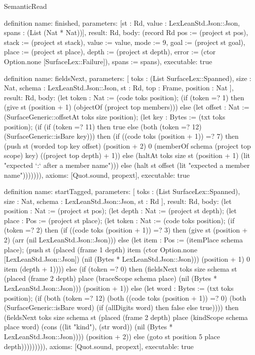 \begin{lexlean}{SemanticRead}
\begin{semanticmodule}
definition{
  name: finished,
  parameters: [st : Rd, value : LexLeanStd.Json::Json, spans : (List (Nat * Nat))],
  result: Rd,
  body: (record Rd {pos := (project st pos), stack := (project st stack), value := value, mode := 9, goal := (project st goal), place := (project st place), depth := (project st depth), error := (ctor Option.none [SurfaceLex::Failure]), spans := spans}),
  executable: true
}

definition{
  name: fieldsNext,
  parameters: [
    toks : (List SurfaceLex::Spanned),
    size : Nat,
    schema : LexLeanStd.Json::Json,
    st : Rd,
    top : Frame,
    position : Nat
  ],
  result: Rd,
  body: (let token : Nat := (code toks position); (if (token =? 1) then (give st (position + 1) (objectOf (project top members))) else (let offset : Nat := (SurfaceGeneric::offsetAt toks size position); (let key : Bytes := (txt toks position); (if (if (token =? 11) then true else (both (token =? 12) (SurfaceGeneric::isBare key))) then (if ((code toks (position + 1)) =? 7) then (push st (worded top key offset) (position + 2) 0 (memberOf schema (project top scope) key) ((project top depth) + 1)) else (haltAt toks size st (position + 1) (lit "expected `:` after a member name"))) else (halt st offset (lit "expected a member name"))))))),
  axioms: [Quot.sound, propext],
  executable: true
}

definition{
  name: startTagged,
  parameters: [
    toks : (List SurfaceLex::Spanned),
    size : Nat,
    schema : LexLeanStd.Json::Json,
    st : Rd
  ],
  result: Rd,
  body: (let position : Nat := (project st pos); (let depth : Nat := (project st depth); (let place : Pos := (project st place); (let token : Nat := (code toks position); (if (token =? 2) then (if ((code toks (position + 1)) =? 3) then (give st (position + 2) (arr (nil LexLeanStd.Json::Json))) else (let item : Pos := (itemPlace schema place); (push st (placed (frame 1 depth) item (ctor Option.none [LexLeanStd.Json::Json]) (nil (Bytes * LexLeanStd.Json::Json))) (position + 1) 0 item (depth + 1)))) else (if (token =? 0) then (fieldsNext toks size schema st (placed (frame 2 depth) place (braceScope schema place) (nil (Bytes * LexLeanStd.Json::Json))) (position + 1)) else (let word : Bytes := (txt toks position); (if (both (token =? 12) (both ((code toks (position + 1)) =? 0) (both (SurfaceGeneric::isBare word) (if (allDigits word) then false else true)))) then (fieldsNext toks size schema st (placed (frame 2 depth) place (kindScope schema place word) (cons ((lit "kind"), (str word)) (nil (Bytes * LexLeanStd.Json::Json)))) (position + 2)) else (goto st position 5 place depth))))))))),
  axioms: [Quot.sound, propext],
  executable: true
}


\end{semanticmodule}
\end{lexlean}
